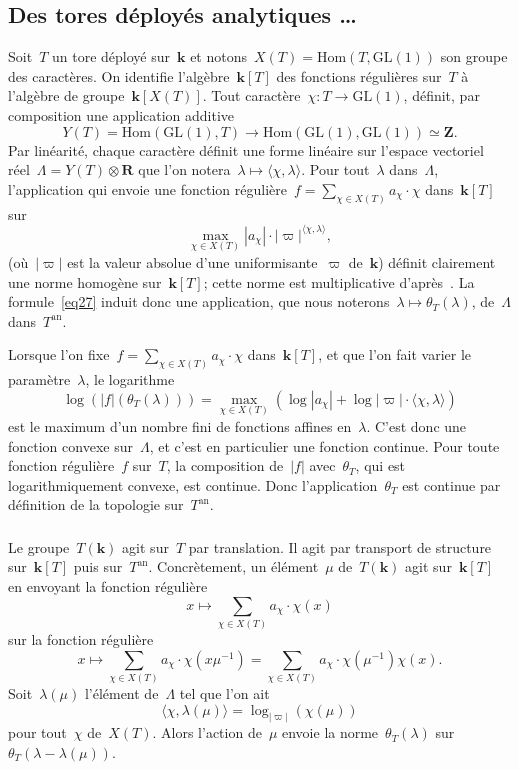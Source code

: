 \documentclass[french]{amsart}
\newcommand{\kk}{\mathbf{k}}
\newcommand{\abs}[1]{{\left|{#1}\right|}}
\newcommand{\an}{\textrm{an}}
\newcommand{\GL}{\mathrm{GL}}
\newcommand{\R}{\mathbf{R}}
\newcommand{\Z}{\mathbf{Z}}
\newcommand{\Hom}{\mathrm{Hom}}
\newcommand{\tens}{\mathop{\otimes}}
\begin{document}
\subsection{Des tores déployés analytiques \ldots}\label{sectionD3}

Soit~$T$ un tore déployé sur~$\kk$ et notons~$X(T)=\Hom(T,\GL(1))$ son groupe des caractères. On identifie l'algèbre~$\kk[T ]$ des fonctions régulières sur~$T$ à l'algèbre de groupe~$\kk[X(T )]$. Tout
caractère~$\chi: T \rightarrow\GL(1)$, définit, par composition une application additive
\[
Y(T)=\Hom(\GL(1),T)\xrightarrow{}\Hom(\GL(1),\GL(1))\simeq\Z.
\]
Par linéarité, chaque caractère définit une forme linéaire sur l'espace vectoriel réel~$\Lambda=Y(T)\tens\R$ que l'on notera~$\lambda\mapsto\langle\chi,\lambda\rangle$. Pour tout~$\lambda$ dans~$\Lambda$, l'application qui envoie une fonction régulière~$f=\sum_{\chi\in X(T)}a_\chi\cdot\chi$ dans~$\kk[T]$ sur
\begin{equation}\label{eq27}
\max_{\chi\in X(T)}\abs{a_\chi}\cdot\abs{\varpi}^{\langle\chi,\lambda\rangle},
\end{equation}
(où~$\abs{\varpi}$ est la valeur absolue d'une uniformisante~$\varpi$ de~$\kk$) définit clairement une norme homogène sur~$\kk[T]$; cette norme est multiplicative d'après~\cite[2.1, p.~21]{Ber90}.  La formule~\eqref{eq27} induit donc une application, que nous noterons~$\lambda \mapsto \theta_T (\lambda)$, de~$\Lambda$ dans~$T^\an$.

Lorsque l'on fixe~$f=\sum_{\chi\in X(T)}a_\chi\cdot\chi$ dans~$\kk[T]$, et 
que l'on fait varier le paramètre~$\lambda$, le logarithme
\[
\log\left(\abs{f}(\theta_T(\lambda))\right)
=\max_{\chi\in X(T)}
\left(
\log\abs{a_\chi}+\log\abs{\varpi}\cdot\langle\chi,\lambda\rangle
\right)
\]
est le maximum d'un nombre fini de fonctions affines en~$\lambda$. C'est donc une fonction convexe sur~$\Lambda$, et c'est en particulier une fonction continue. Pour toute fonction régulière~$f$ sur~$T$, la composition de~$\abs{f}$ avec~$\theta_T$, qui est logarithmiquement
convexe, est continue. Donc l'application~$\theta_T$ est continue par définition de la topologie sur~$T^\an$.

\subsubsection{}\label{sectionD31}
Le groupe~$T (\kk)$ agit sur~$T$ par translation. Il agit par transport de structure sur~$\kk[T ]$ puis sur~$T^\an$. Concrètement, un élément~$\mu$ de~$T (\kk)$ agit sur~$\kk[T ]$ en envoyant la fonction régulière
\[
x\mapsto\sum_{\chi\in X(T)} a_\chi\cdot \chi(x)
\]
sur la fonction régulière
\[
x\mapsto
\sum_{\chi\in X(T)} a_\chi\cdot \chi(x\mu^{-1})
=
\sum_{\chi\in X(T)} a_\chi\cdot \chi(\mu^{-1})\chi(x).
\]
Soit~$\lambda(\mu)$ l'élément de~$\Lambda$ tel que l'on ait
\[
\langle\chi,\lambda(\mu)\rangle=\log_{\abs{\varpi}}(\chi(\mu))
\]
pour tout~$\chi$ de~$X(T)$. Alors l'action de~$\mu$ envoie la norme~$\theta_T (\lambda)$ sur~$\theta_T (\lambda-\lambda(\mu))$.
\end{document}
